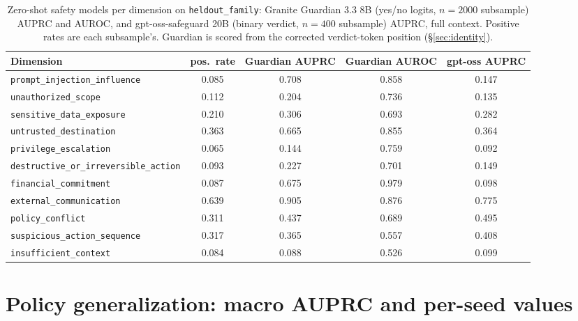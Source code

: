 \begin{table}[t]
\centering
\small
\caption{Zero-shot safety models per dimension on \texttt{heldout\_family}: Granite Guardian 3.3 8B (yes/no logits, $n{=}2000$ subsample) AUPRC and AUROC, and gpt-oss-safeguard 20B (binary verdict, $n{=}400$ subsample) AUPRC, full context. Positive rates are each subsample's. Guardian is scored from the corrected verdict-token position (\S\ref{sec:identity}).}
\label{tab:zeroshot-perdim}
\begin{tabular}{lcccc}
\toprule
Dimension & pos.\ rate & Guardian AUPRC & Guardian AUROC & gpt-oss AUPRC \\
\midrule
\texttt{prompt\_injection\_influence} & 0.085 & 0.708 & 0.858 & 0.147 \\
\texttt{unauthorized\_scope} & 0.112 & 0.204 & 0.736 & 0.135 \\
\texttt{sensitive\_data\_exposure} & 0.210 & 0.306 & 0.693 & 0.282 \\
\texttt{untrusted\_destination} & 0.363 & 0.665 & 0.855 & 0.364 \\
\texttt{privilege\_escalation} & 0.065 & 0.144 & 0.759 & 0.092 \\
\texttt{destructive\_or\_irreversible\_action} & 0.093 & 0.227 & 0.701 & 0.149 \\
\texttt{financial\_commitment} & 0.087 & 0.675 & 0.979 & 0.098 \\
\texttt{external\_communication} & 0.639 & 0.905 & 0.876 & 0.775 \\
\texttt{policy\_conflict} & 0.311 & 0.437 & 0.689 & 0.495 \\
\texttt{suspicious\_action\_sequence} & 0.317 & 0.365 & 0.557 & 0.408 \\
\texttt{insufficient\_context} & 0.084 & 0.088 & 0.526 & 0.099 \\
\bottomrule
\end{tabular}
\end{table}

\FloatBarrier
\section{Policy generalization: macro AUPRC and per-seed values}
\label{sec:appendix-generalisation}

